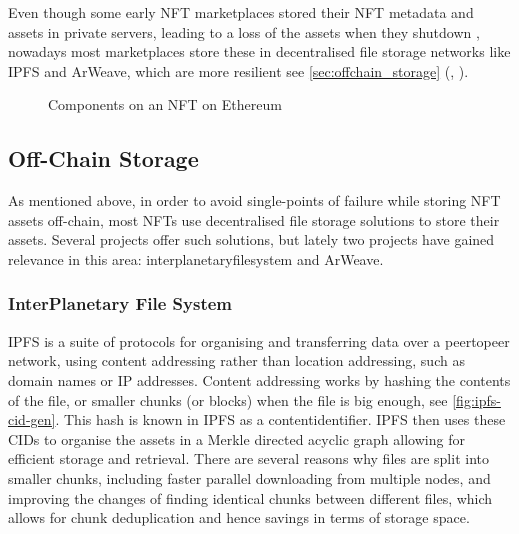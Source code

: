 Even though some early NFT marketplaces stored their NFT metadata and assets in private servers, leading to a loss of the assets when they shutdown \cite{gallenHistoryNFTMarketplaces2023}, nowadays most marketplaces store these in decentralised file storage networks like IPFS and ArWeave, which are more resilient  see \autoref{sec:offchain_storage} (, \pageref{sec:offchain_storage}).


\begin{figure}[h]
    \centering
    \captionsetup{justification=centering}
    
    \caption[Components on an NFT on on Ethereum]{Components on an NFT on Ethereum}
    \label{fig:nftcomponents}
\end{figure}

\subsection{Off-Chain Storage}
\label{sec:offchain_storage}

As mentioned above, in order to avoid single-points of failure while storing NFT assets off-chain, most NFTs use decentralised file storage solutions to store their assets. Several projects offer such solutions, but lately two projects have gained relevance in this area: \gls{interplanetaryfilesystem} and ArWeave. 

\subsubsection{InterPlanetary File System}
\label{sec:ipfs}

IPFS is a suite of protocols for organising and transferring data over a \gls{peertopeer} network, using content addressing rather than location addressing, such as domain names or IP addresses.
Content addressing works by hashing the contents of the file, or smaller chunks (or blocks) when the file is big enough, see \autoref{fig:ipfs-cid-gen}. This hash is known in IPFS as a \gls{contentidentifier}. IPFS then uses these CIDs to organise the assets in a Merkle \gls{directed acyclic graph} allowing for efficient storage and retrieval. There are several reasons why files are split into smaller chunks, including faster parallel downloading from multiple nodes, and improving the changes of finding identical chunks between different files, which allows for chunk deduplication and hence savings in terms of storage space. \cite{juBlockchainTraceabilitySystem2022}


